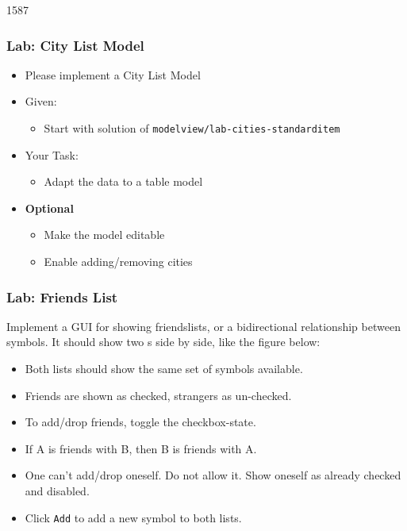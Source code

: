 \begin{slide}{1587}\frametitle{Lab: City List Model}
  \begin{itemize}
  \item Please implement a City List Model
  \item Given:
    \begin{itemize}
    \item Start with solution of \texttt{modelview/lab-cities-standarditem}
    \end{itemize}
  \item Your Task:
    \begin{itemize}
    \item Adapt the data to a table model
    \end{itemize}
  \item \textbf{Optional}
    \begin{itemize}
    \item Make the model editable
    \item Enable adding/removing cities
   \end{itemize}
 \end{itemize}
\end{slide}

\begin{slide}[fragile]
\frametitle{Lab: Friends List}
Implement a GUI for showing friendslists, or a bidirectional relationship between symbols.
It should show two s side by side, like the figure below:


\begin{itemize}
\item  Both lists should show the same set of symbols available.
\item  Friends are shown as checked, strangers as un-checked.
\item  To add/drop friends, toggle the checkbox-state.
\item  If A is friends with B, then B is friends with A.
\item  One can't add/drop oneself. Do not allow it. Show oneself as already checked and disabled.
\item  Click \texttt{Add} to add a new symbol to both lists.

\end{itemize}
\end{slide}


